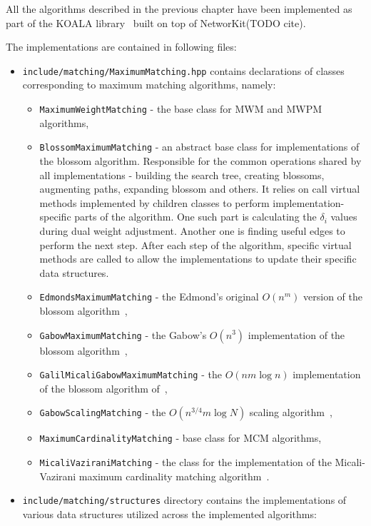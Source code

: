 All the algorithms described in the previous chapter have been implemented as part of the KOALA library~\cite{koala-networkit} built on top of NetworKit(TODO cite). 

The implementations are contained in following files:

\begin{itemize}
    \item \texttt{include/matching/MaximumMatching.hpp} contains declarations of classes corresponding to maximum matching algorithms, namely: \begin{itemize}
        \item \texttt{MaximumWeightMatching} - the base class for \textsc{MWM} and \textsc{MWPM} algorithms,
        \item \texttt{BlossomMaximumMatching} - an abstract base class for implementations of the blossom algorithm. Responsible for the common operations shared by all implementations - building the search tree, creating blossoms, augmenting paths, expanding blossom and others. It relies on call virtual methods implemented by children classes to perform implementation-specific parts of the algorithm. One such part is calculating the $\delta_i$ values during dual weight adjustment. Another one is finding useful edges to perform the next step. After each step of the algorithm, specific virtual methods are called to allow the implementations to update their specific data structures.
        \item \texttt{EdmondsMaximumMatching} - the Edmond's original $O(n^m)$ version of the blossom algorithm~\cite{edmonds1965maximum},
        \item \texttt{GabowMaximumMatching} - the Gabow's $O(n^3)$ implementation of the blossom algorithm~\cite{gabow1974implementation},
        \item \texttt{GalilMicaliGabowMaximumMatching} - the $O(nm\log n)$ implementation of the blossom algorithm of~\cite{galil1986ev},
        \item \texttt{GabowScalingMatching} - the $O(n^{3/4}m\log N)$ scaling algorithm~\cite{gabow1984scaling},
        \item \texttt{MaximumCardinalityMatching} - base class for \textsc{MCM} algorithms,
        \item \texttt{MicaliVaziraniMatching} - the class for the implementation of the Micali-Vazirani maximum cardinality matching algorithm~\cite{micali1980v}.
    \end{itemize}
    \item \texttt{include/matching/structures} directory contains the implementations of various data structures utilized across the implemented algorithms: \begin{itemize}

\end{itemize}
\end{itemize}
